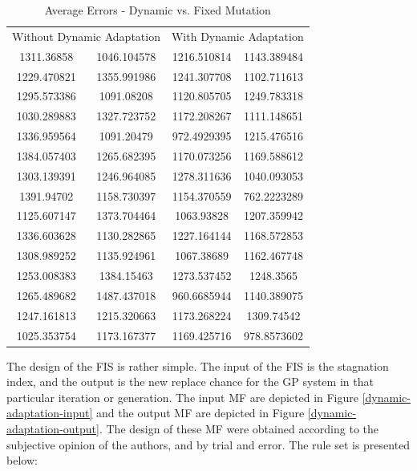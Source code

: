 \documentclass[a4paper,twoside]{article}
\begin{document}
\begin{table}
    \caption{{Average Errors - Dynamic vs. Fixed Mutation}}
    \label{dynamic-vs-non-dynamic-table}
    \begin{tabular}{ c c | c c}
        \multicolumn{2}{c}{Without Dynamic Adaptation} & \multicolumn{2}{c}{With Dynamic Adaptation} \\ 
         1311.36858  & 1046.104578 & 1216.510814 & 1143.389484 \\ 
         1229.470821 & 1355.991986 & 1241.307708 & 1102.711613 \\ 
         1295.573386 & 1091.08208  & 1120.805705 & 1249.783318 \\ 
         1030.289883 & 1327.723752 & 1172.208267 & 1111.148651 \\ 
         1336.959564 & 1091.20479  & 972.4929395 & 1215.476516 \\ 
         1384.057403 & 1265.682395 & 1170.073256 & 1169.588612 \\ 
         1303.139391 & 1246.964085 & 1278.311636 & 1040.093053 \\ 
         1391.94702  & 1158.730397 & 1154.370559 & 762.2223289 \\ 
         1125.607147 & 1373.704464 & 1063.93828  & 1207.359942 \\ 
         1336.603628 & 1130.282865 & 1227.164144 & 1168.572853 \\
         1308.989252 & 1135.924961 & 1067.38689  & 1162.467748 \\
         1253.008383 & 1384.15463  & 1273.537452 & 1248.3565   \\
         1265.489682 & 1487.437018 & 960.6685944 & 1140.389075 \\
         1247.161813 & 1215.320663 & 1173.268224 & 1309.74542  \\
         1025.353754 & 1173.167377 & 1169.425716 & 978.8573602 \\
    \end{tabular} 
\end{table}

The design of the FIS is rather simple. The input of the FIS is the stagnation index, and the output is the new replace chance for the GP system in that particular iteration or generation. The input MF are depicted in Figure \ref{dynamic-adaptation-input} and the output MF are depicted in Figure \ref{dynamic-adaptation-output}. The design of these MF were obtained according to the subjective opinion of the authors, and by trial and error. The rule set is presented below:
\end{document}
